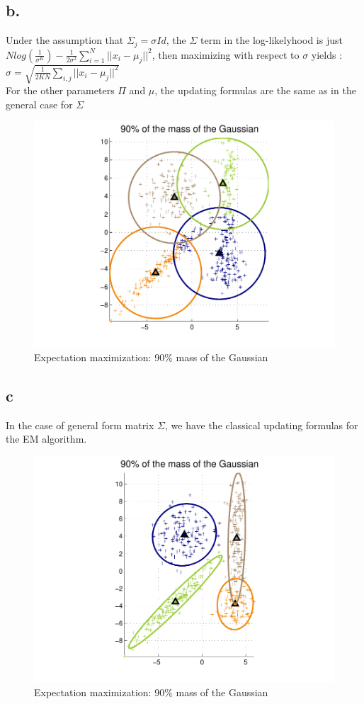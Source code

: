 \documentclass[12pt]{article}
\begin{document}
\subsection*{b.}
Under the assumption that $\Sigma_{j} = \sigma Id$, the $\Sigma$ term in the log-likelyhood is just ~\\
$N log(\frac{1}{\sigma^{K}})-\frac{1}{2\sigma^{2}} \sum \limits_{i=1}^N ||x_{i}-\mu_{j}||^{2}$, then maximizing with respect to $\sigma$ yields :~\\
$\sigma=\sqrt{\frac{1}{2KN}\sum \limits_{i,j} ||x_{i}-\mu_{j}||^2}$~\\
For the other parameters $\Pi$ and $\mu$, the updating formulas are the same as in the general case for $\Sigma$
\begin{figure}[h!]
	\centering 
	\includegraphics[width=.8\textwidth]{./pics/3b.pdf}
	\caption{Expectation maximization: 90\% mass of the Gaussian}
	\label{fig:3b}
\end{figure}

\subsection*{c}
In the case of general form matrix $\Sigma$, we have the classical updating formulas for the EM algorithm.

\begin{figure}[h!]
	\centering 
	\includegraphics[width=.8\textwidth]{./pics/3c.pdf}
	\caption{Expectation maximization: 90\% mass of the Gaussian}
	\label{fig:3c}
\end{figure}
\end{document}
